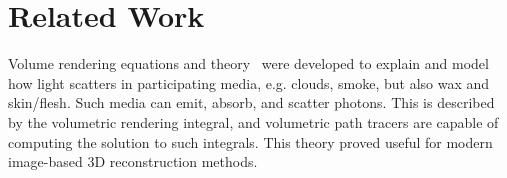 \section{Related Work}
\begin{comment}
Volume rendering is concerned about how light scatters in participating media, e.g. clouds, smoke, but also wax and skin / flesh.
Such media can absorb, create, and scatter photons.
This is described by the volumetric rendering integral, and volumetric path tracers are capable of computing the solution to such integrals.
\reftodo{some vol pt refs}
Often, scattering can be discarded as the full gamut of effects is not necessary.
This results in the somewhat simplified Equation \ref{eq:volumetric_integration}.
\reftodo{simplified, used in vis}

NERFs take Equation \ref{eq:volumetric_integration}, a differentiable rendering algorithm based on ray marching, a data model based on multi-layer perceptrons (MLPs), and learn their weights by means of backpropagation through the ray marcher and gradient decent. \reftodo{..}

EWA splatting, introduced by \reftodo{zwicker et. al} is a method to compute an approximation of Equation \ref{eq:volumetric_integration}.
To do so, the volumetric data is stored in Gaussian mixtures, which are then sorted and projected to the screen.

3D Gaussian Splatting for Real-Time Radiance Field Rendering (3DGS) basically took the EWA splatting algorithm, simplified it a bit more (by using the opacity formulation), made it even faster, and made it possible to learn Gaussian mixtures by backpropagation and gradient decent.

Stop the pop (STP) is an improvement on 3DGS, where they implemented a per-pixel sorting step and hierarchical culling to make it tracktable \todo{is that correct? extend as i know really little about it}.
\end{comment}
Volume rendering equations and theory~\cite{Max95, Novak18Course} were developed to explain and model how light scatters in participating media, e.g. clouds, smoke, but also wax and skin/flesh. Such media can emit, absorb, and scatter photons. This is described by the volumetric rendering integral, and volumetric path tracers are capable of computing the solution to such integrals.
This theory proved useful for modern image-based 3D reconstruction methods. 

